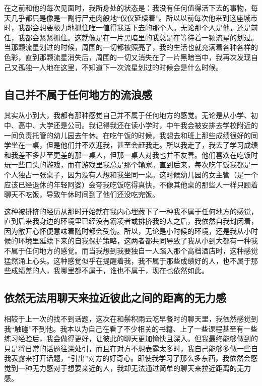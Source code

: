 在之前和他的每次见面时，我所身处的状态是：我没有任何值得活下去的事物，每天几乎都只是像是一副行尸走肉般地“仅仅延续着”。所以以前每次他来到这座城市时，我都会想要极力地抓住唯一值得我活下去的那个人。无论那个人是他，还是前任，我都会紧紧抓住。这就像是在一片黑暗里的我总是在等待着一颗流星的划过。当那颗流星划过的时候，周围的一切都被照亮了，我的生活也就充满着各种各样的色彩，直到那颗流星消失后，周围的一切又消失在了一片黑暗当中，我再次发现自己又孤独一人地在这里，不知道下一次流星划过的时候会是什么时候。




\subsection*{自己并不属于任何地方的流浪感}

其实从小到大，我都有那种感觉\pozhehao{}自己并不属于任何地方的感觉。无论是从小学、初中、高中、大学还是公司。我记得我还在读小学时，中午我会被安排去学校附近的一间负责托管的幼儿园去午休。在吃午饭的时候，我想去和班上那些成绩很好的同学坐在一桌，但是他们并不欢迎我，甚至会赶我走。所以我走了，我去了学习成绩和我差不多甚至更差的那一桌人，但那一桌人对我也并不友善。他们喜欢在吃饭时玩一些口头的游戏，而在游戏里我总是那个输家。直到后来，每次吃午饭我都是一个人独占一张桌子，因为没有人想和我坐同一桌。这时候幼儿园的女主管（是一个应该已经退休的年轻阿婆）会夸我吃饭吃得真快，不像其他桌的那些人一样只顾着聊天不吃饭，导致午休时间到了他们还没吃完饭。

这种被排挤的经历从那时开始就在我内心埋藏下了一种我不属于任何地方的感觉，直到后来我身边的环境里已经没有霸凌者或排挤我的人之后，我依然自我封闭着，因为敞开心怀便意味着随时都会受伤。所以，无论是小时候的环境，还是我从小时候的环境里延续下来的自我保护策略，这两者都共同导致了我从小到大都有一种我不属于任何地方的感觉。而当我想到我要独自一人踏入那个高档酒店时，这种感觉猛然涌上心头。这种感觉似乎在提醒着我，我不属于那些成绩好的人，也不属于那些成绩差的人，我哪里都不属于，谁也不属于，现在也依然如此。




\subsection*{依然无法用聊天来拉近彼此之间的距离的无力感}

相较于上一次的找不到话题，这次在和鬃积雨云吃早餐时的聊天里，我依然感觉到我“触碰”不到他。我本以为自己在看了不少相关的书籍、上了一些课程甚至有一些练习经验后，我会做得更好，让彼此的聊天更加愉快且深入。但我最终能够做到的只是将日常的话题往深处引，而且在对方不想表露太多时，我自己能够多做一些自我表露来打开话题，“引出”对方的好奇心。即使我学习了那么多东西，我依然会感觉到一种无力感\pozhehao{}对于想要亲近的人，我却无法通过简单的聊天来拉近距离的无力感。

